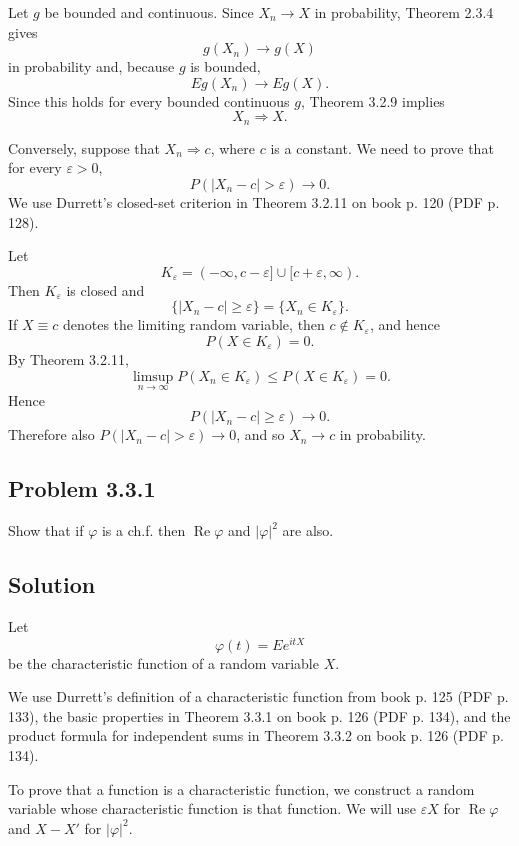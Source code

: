 \documentclass[a4paper,12pt,openany]{article}
\theoremstyle{plain}
\theoremstyle{definition}
\begin{document}
\medskip

Let $g$ be bounded and continuous. Since $X_n\to X$ in probability, Theorem 2.3.4 gives
\[
g(X_n)\to g(X)
\]
in probability and, because $g$ is bounded,
\[
Eg(X_n)\to Eg(X).
\]
Since this holds for every bounded continuous $g$, Theorem 3.2.9 implies
\[
X_n\Rightarrow X.
\]

\medskip

Conversely, suppose that $X_n\Rightarrow c$, where $c$ is a constant. We need to prove that for every $\varepsilon>0$,
\[
P(|X_n-c|>\varepsilon)\to 0.
\]
We use Durrett's closed-set criterion in Theorem 3.2.11 on book p. 120 (PDF p. 128).

Let
\[
K_\varepsilon=(-\infty,c-\varepsilon]\cup[c+\varepsilon,\infty).
\]
Then $K_\varepsilon$ is closed and
\[
\{|X_n-c|\ge \varepsilon\}=\{X_n\in K_\varepsilon\}.
\]
If $X\equiv c$ denotes the limiting random variable, then $c\notin K_\varepsilon$, and hence
\[
P(X\in K_\varepsilon)=0.
\]
By Theorem 3.2.11,
\[
\limsup_{n\to\infty}P(X_n\in K_\varepsilon)
\le
P(X\in K_\varepsilon)
=0.
\]
Hence
\[
P(|X_n-c|\ge\varepsilon)\to 0.
\]
Therefore also $P(|X_n-c|>\varepsilon)\to 0$, and so $X_n\to c$ in probability.

\subsection*{Problem 3.3.1}

Show that if $\varphi$ is a ch.f. then $\operatorname{Re}\varphi$ and $|\varphi|^2$ are also.

\subsection*{Solution}

Let
\[
\varphi(t)=Ee^{itX}
\]
be the characteristic function of a random variable $X$.

We use Durrett's definition of a characteristic function from book p. 125 (PDF p. 133), the basic properties in Theorem 3.3.1 on book p. 126 (PDF p. 134), and the product formula for independent sums in Theorem 3.3.2 on book p. 126 (PDF p. 134).

To prove that a function is a characteristic function, we construct a random variable whose characteristic function is that function. We will use $\varepsilon X$ for $\operatorname{Re}\varphi$ and $X-X'$ for $|\varphi|^2$.

\medskip
\end{document}
